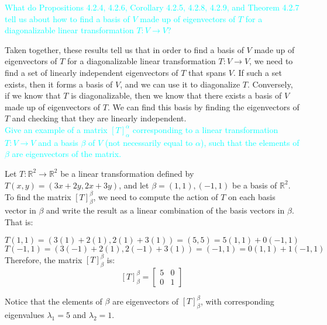 \documentclass[fontsize=12pt]{scrartcl}
\begin{document}
\newpage
\noindent
\textcolor{cyan}{What do Propositions 4.2.4, 4.2.6, Corollary 4.2.5, 4.2.8, 4.2.9, and Theorem 4.2.7 tell us about how to find a basis of $V$ made up of eigenvectors of $T$ for a diagonalizable linear transformation $T: V \to V$?}

\noindent
Taken together, these results tell us that in order to find a basis of $V$ made up of eigenvectors of $T$ for a diagonalizable linear transformation $T: V \to V$, we need to find a set of linearly independent eigenvectors of $T$ that spans $V$. If such a set exists, then it forms a basis of $V$, and we can use it to diagonalize $T$. Conversely, if we know that $T$ is diagonalizable, then we know that there exists a basis of $V$ made up of eigenvectors of $T$. We can find this basis by finding the eigenvectors of $T$ and checking that they are linearly independent.
\\

\noindent
\textcolor{cyan}{Give an example of a matrix $[T]_{\alpha}^{\alpha}$ corresponding to a linear transformation $T: V \to V$ and a basis $\beta$ of $V$ (not necessarily equal to $\alpha$), such that the elements of $\beta$ are eigenvectors of the matrix.}

\noindent
Let $T: \mathbb{R}^2 \to \mathbb{R}^2$ be a linear transformation defined by $T(x,y) = (3x + 2y, 2x + 3y)$, and let $\beta = {(1,1), (-1,1)}$ be a basis of $\mathbb{R}^2$. To find the matrix $[T]_{\beta}^{\beta}$, we need to compute the action of $T$ on each basis vector in $\beta$ and write the result as a linear combination of the basis vectors in $\beta$. That is:

$$T(1, 1) = (3(1) + 2(1), 2(1) + 3(1)) = (5, 5) = 5(1, 1) + 0(-1, 1) $$
$$T(-1, 1) = (3(-1) + 2(1), 2(-1)+ 3(1)) = (-1, 1)  = 0(1, 1) + 1(-1, 1)$$
Therefore, the matrix $[T]_{\beta}^{\beta}$ is:
$$[T]_{\beta}^{\beta} = \begin{bmatrix} 5 & 0 \\ 0 & 1\end{bmatrix} $$

\noindent
Notice that the elements of $\beta$ are eigenvectors of $[T]_{\beta}^{\beta}$, with corresponding eigenvalues $\lambda_1 = 5$ and $\lambda_2 = 1$.
\end{document}
